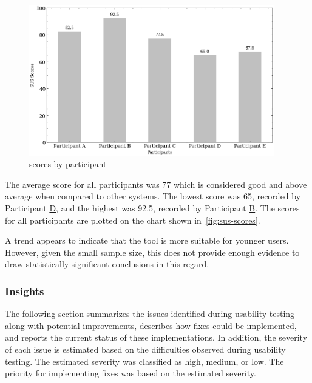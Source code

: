 \begin{figure}[h!]
\centering
\includegraphics[width=0.95\textwidth]{images/graph_sus.png}
\caption{ scores by participant}
\label{fig:sus-scores}
\end{figure}


The average  score for all participants was 77 which is considered good and above average when compared to other systems. The lowest  score was 65, recorded by Participant \hyperref[itm:D]{D}, and the highest was 92.5, recorded by Participant \hyperref[itm:B]{B}. The scores for all participants are plotted on the chart shown in~\autoref{fig:sus-scores}.

A trend appears to indicate that the tool is more suitable for younger users. However, given the small sample size, this does not provide enough evidence to draw statistically significant conclusions in this regard.


\subsubsection{Insights} \label{section:insights}

The following section summarizes the issues identified during usability testing along with potential improvements, describes how fixes could be implemented, and reports the current status of these implementations. In addition, the severity of each issue is estimated based on the difficulties observed during usability testing. The estimated severity was classified as high, medium, or low. The priority for implementing fixes was based on the estimated severity.

